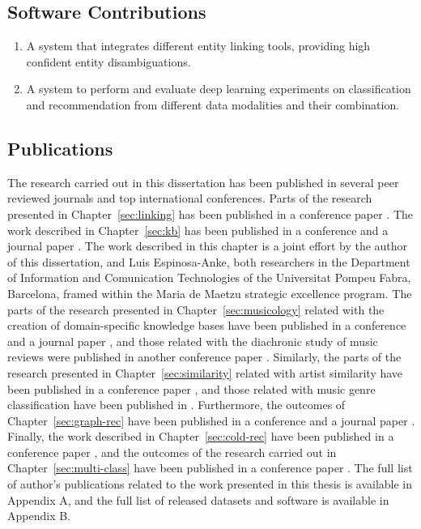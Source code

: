 \subsection{Software Contributions}

\begin{enumerate}
\item
A system that integrates different entity linking tools, providing high confident entity disambiguations.

\item
A system to perform and evaluate deep learning experiments on classification and recommendation from different data modalities and their combination. %

\end{enumerate}

\subsection{Publications}
\label{sec:conclusion:publications}

The research carried out in this dissertation has been published in several peer reviewed journals and top international conferences. Parts of the research presented in Chapter~\ref{sec:linking} has been published in a conference paper \cite{Oramas2016}. The work described in Chapter~\ref{sec:kb} has been published in a conference and a journal paper \cite{Oramas2015,Oramas2016a}. The work described in this chapter is a joint effort by the author of this dissertation, and Luis Espinosa-Anke, both researchers in the Department of Information and Comunication Technologies of the Universitat Pompeu Fabra, Barcelona, framed within the Maria de Maetzu strategic excellence program. The parts of the research presented in Chapter~\ref{sec:musicology} related with the creation of domain-specific knowledge bases have been published in a conference and a journal paper \cite{Oramas2015b,}, and those related with the diachronic study of music reviews were published in another conference paper \cite{oramas2016exploring}. Similarly, the parts of the research presented in Chapter~\ref{sec:similarity} related with artist similarity have been published in a conference paper \cite{Oramas2015a}, and those related with music genre classification have been published in \cite{oramas2016exploring}. Furthermore, the outcomes of Chapter~\ref{sec:graph-rec} have been published in a conference and a journal paper \cite{Ostuni2015,oramas2016sound}. Finally, the work described in Chapter~\ref{sec:cold-rec} have been published in a conference paper \cite{}, and the outcomes of the research carried out in Chapter~\ref{sec:multi-class} have been published in a conference paper \cite{}. The full list of author's publications related to the work presented in this thesis is available in Appendix A, and the full list of released datasets and software is available in Appendix B.


